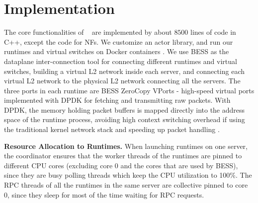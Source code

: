 \section{Implementation}
\label{sec:implementation}


The core functionalities of \nfactor~ are implemented by about $8500$ lines of code in C++, except the code for NFs. We customize an actor library, and run our runtimes and virtual switches on Docker containers \cite{docker}. We use BESS \cite{bess} as the dataplane inter-connection tool for connecting different runtimes and virtual switches, building a virtual L2 network inside each server, and connecting each virtual L2 network to the physical L2 network connecting all the servers. The three ports in each runtime are BESS ZeroCopy VPorts - high-speed virtual ports implemented with DPDK for fetching and transmitting raw packets. With DPDK, the memory holding packet buffers is mapped directly into the address space of the runtime process, %
avoiding high context switching overhead if using the traditional kernel network stack and speeding up packet handling \cite{martins2014clickos}. %

\vspace{1mm}
\noindent \textbf{Resource Allocation to Runtimes.} %
When launching runtimes on one server, the coordinator ensures that the worker threads of the runtimes are pinned to different CPU cores (excluding core 0 and the cores that are used by BESS), since they are busy polling threads which keep the CPU utilization to 100\%. The RPC threads of all the runtimes in the same server are collective pinned to core 0, since they sleep for most of the time waiting for RPC requests.  %

